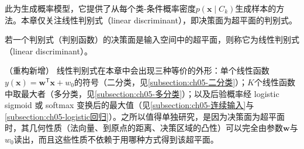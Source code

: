 \documentclass[../main.tex]{subfiles}
\begin{document}
此为生成概率模型，它提供了从每个类-条件概率密度$p(\boldsymbol{x}\mid C_k)$生成样本的方法。本章仅关注线性判别式（linear discriminant），即决策面为超平面的判别式。

\begin{definition}[线性判别式]\label{definition:ch05-线性判别式}
若一个判别式（判别函数）的决策面是输入空间中的超平面，则称它为线性判别式（linear discriminant）。
\end{definition}

\begin{remark}（重构新增）
线性判别式在本章中会出现三种等价的外形：单个线性函数$y(\boldsymbol{x})=\boldsymbol{w}^{\mathsf{T}}\boldsymbol{x}+w_0$的符号（二分类，见\cref{subsection:ch05-二分类}）；$K$个线性函数中取最大者（多分类，见\cref{subsection:ch05-多分类}）；以及后验概率经 logistic sigmoid 或 softmax 变换后的最大值（见\cref{subsection:ch05-连续输入}与\cref{subsection:ch05-logistic回归}）。之所以值得单独研究，是因为决策面为超平面时，其几何性质（法向量、到原点的距离、决策区域的凸性）可以完全由参数$\boldsymbol{w}$与$w_0$读出，而且这些性质不依赖于用哪种方式得到该超平面。
\end{remark}






\end{document}
